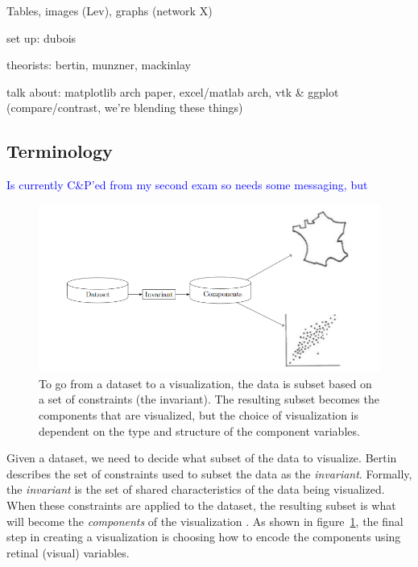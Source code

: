 \documentclass[../main.tex]{subfiles}
\begin{document}
Tables, images (Lev), graphs (network X)

set up: dubois

theorists:
bertin, munzner, mackinlay

talk about:
matplotlib arch paper, excel/matlab arch, 
vtk \& ggplot (compare/contrast, we're blending these things) 


\subsection{Terminology}
\textcolor{blue}{Is currently C\&P'ed from my second exam so needs some messaging, but }
\begin{figure}[h!]
\includegraphics[width=\textwidth]{figures/intro/flowchart.png} 
\caption{To go from a dataset to a visualization, the data is subset based on a set of constraints (the invariant). The resulting subset becomes the components that are visualized, but the choice of visualization is dependent on the type and structure of the component variables.}
\label{fig:flowchart}
\end{figure}

Given a dataset, we need to decide what subset of the data to visualize. Bertin describes the set of constraints used to subset the data as the \textit{invariant}. Formally, the \textit{invariant} is the set of shared characteristics of the data being visualized. When these constraints are applied to the dataset, the resulting subset is what will become the \textit{components} of the visualization \cite{bertinSemiologyGraphicsDiagrams2011a}. 
As shown in figure~\ref{fig:flowchart}, the final step in creating a visualization is choosing how to encode the
components using retinal (visual) variables.
 
\end{document}

